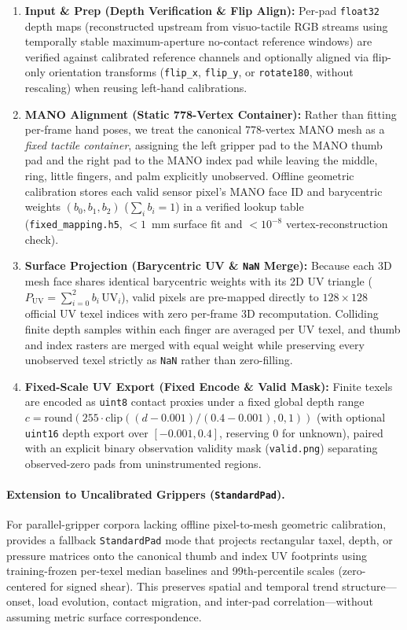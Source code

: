 \begin{enumerate}[leftmargin=*,nosep]
    \item \textbf{Input \& Prep (Depth Verification \& Flip Align):} Per-pad \texttt{float32} depth maps (reconstructed upstream from visuo-tactile RGB streams using temporally stable maximum-aperture no-contact reference windows) are verified against calibrated reference channels and optionally aligned via flip-only orientation transforms (\texttt{flip\_x}, \texttt{flip\_y}, or \texttt{rotate180}, without rescaling) when reusing left-hand calibrations.
    \item \textbf{MANO Alignment (Static 778-Vertex Container):} Rather than fitting per-frame hand poses, we treat the canonical 778-vertex MANO mesh as a \emph{fixed tactile container}, assigning the left gripper pad to the MANO thumb pad and the right pad to the MANO index pad while leaving the middle, ring, little fingers, and palm explicitly unobserved. Offline geometric calibration stores each valid sensor pixel's MANO face ID and barycentric weights $(b_0, b_1, b_2)$ ($\sum_i b_i = 1$) in a verified lookup table (\texttt{fixed\_mapping.h5}, $<1$~mm surface fit and $<10^{-8}$ vertex-reconstruction check).
    \item \textbf{Surface Projection (Barycentric UV \& \texttt{NaN} Merge):} Because each 3D mesh face shares identical barycentric weights with its 2D UV triangle ($P_{\text{UV}} = \sum_{i=0}^2 b_i\,\mathrm{UV}_i$), valid pixels are pre-mapped directly to $128\times 128$ official UV texel indices with zero per-frame 3D recomputation. Colliding finite depth samples within each finger are averaged per UV texel, and thumb and index rasters are merged with equal weight while preserving every unobserved texel strictly as \texttt{NaN} rather than zero-filling.
    \item \textbf{Fixed-Scale UV Export (Fixed Encode \& Valid Mask):} Finite texels are encoded as \texttt{uint8} contact proxies under a fixed global depth range $c = \mathrm{round}(255\cdot\mathrm{clip}((d - 0.001)/(0.4 - 0.001), 0, 1))$ (with optional \texttt{uint16} depth export over $[-0.001, 0.4]$, reserving $0$ for unknown), paired with an explicit binary observation validity mask (\texttt{valid.png}) separating observed-zero pads from uninstrumented regions.
\end{enumerate}

\paragraph{Extension to Uncalibrated Grippers (\texttt{StandardPad}).}
For parallel-gripper corpora lacking offline pixel-to-mesh geometric calibration, \bench{} provides a fallback \texttt{StandardPad} mode that projects rectangular taxel, depth, or pressure matrices onto the canonical thumb and index UV footprints using training-frozen per-texel median baselines and 99th-percentile scales (zero-centered for signed shear). This preserves spatial and temporal trend structure---onset, load evolution, contact migration, and inter-pad correlation---without assuming metric surface correspondence.

